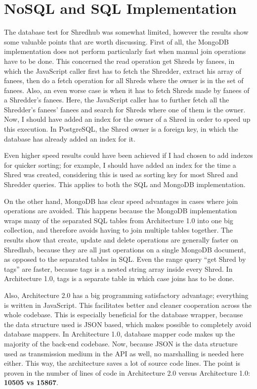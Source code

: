 \section{NoSQL and SQL Implementation}
The database test for Shredhub was somewhat limited, however the results show some valuable points that are worth discussing. First of all, the MongoDB implementation does not perform particularly fast when manual join operations have to be done. This concerned the read operation get Shreds by fanees, in which the JavaScript caller first has to fetch the Shredder, extract his array of fanees, then do a fetch operation for all Shreds where the owner is in the set of fanees. Also, an even worse case is when it has to fetch Shreds made by fanees of a Shredder's fanees. Here, the JavaScript caller has to further fetch all the Shredder's fanees' fanees and search for Shreds where one of them is the owner. Now, I should have added an index for the owner of a Shred in order to speed up this execution. In PostgreSQL, the Shred owner is a foreign key, in which the database has already added an index for it.

Even higher speed results could have been achieved if I had chosen to add indexes for quicker sorting; for example, I should have added an index for the time a Shred was created, considering this is used as sorting key for most Shred and Shredder queries. This applies to both the SQL and MongoDB implementation. 

On the other hand, MongoDB has clear speed advantages in cases where join operations are avoided. This happens because the MongoDB implementation wraps many of the separated SQL tables from Architecture 1.0 into one big collection, and therefore avoids having to join multiple tables together. The results show that create, update and delete operations are generally faster on Shredhub, because they are all just operations on a single MongoDB document, as opposed to the separated tables in SQL. Even the range query ``get Shred by tags'' are faster, because tags is a nested string array inside every Shred. In Architecture 1.0, tags is a separate table in which case joins has to be done.

Also, Architecture 2.0 has a big programming satisfactory advantage; everything is written in JavaScript. This facilitates better and cleaner cooperation across the whole codebase. This is especially beneficial for the database wrapper, because the data structure used is JSON based, which makes possible to completely avoid database mappers. In Architecture 1.0, database mapper code makes up the majority of the back-end codebase. Now, because JSON is the data structure used as transmission medium in the API as well, no marshalling is needed here either. This way, the architecture saves a lot of source code lines. The point is proven in the number of lines of code in Architecture 2.0 versus Architecture 1.0: \textbf{10505 vs 15867}. 

